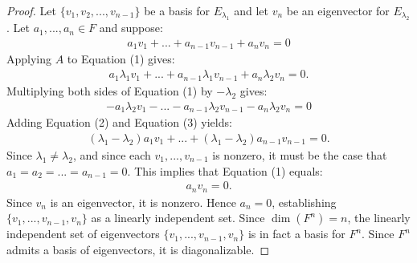\documentclass[10pt,twoside,openany]{memoir}
\begin{document}
    {\color{blue} \begin{proof}
        Let $\{v_1,v_2,...,v_{n-1}\}$ be a basis for $E_{\lambda_1}$ and let $v_n$ be an eigenvector for $E_{\lambda_2}$. Let $a_1,...,a_n \in F$ and suppose: 
            \begin{equation}
            \begin{split}
                a_1v_1 + ... + a_{n-1}v_{n-1} + a_n v_n = 0
            \end{split}
            \end{equation}
        Applying $A$ to Equation (1) gives:
            \begin{equation}
            \begin{split}
                a_1 \lambda_1 v_1 + ... + a_{n-1} \lambda_1 v_{n-1} + a_n \lambda_2 v_n = 0.
            \end{split}
            \end{equation}
        Multiplying both sides of Equation (1) by $-\lambda_2$ gives:
            \begin{equation}
            \begin{split}
                -a_1\lambda_2v_1 - ... - a_{n-1}\lambda_2v_{n-1} - a_n\lambda_2 v_n = 0
            \end{split}
            \end{equation}
        Adding Equation (2) and Equation (3) yields:
            \begin{equation*}
            \begin{split}
                (\lambda_1 - \lambda_2)a_1v_1 + ... + (\lambda_1 - \lambda_2)a_{n-1}v_{n-1} = 0.
            \end{split}
            \end{equation*}
        Since $\lambda_1 \neq \lambda_2$, and since each $v_1,...,v_{n-1}$ is nonzero, it must be the case that $a_1=a_2=...=a_{n-1} = 0$. This implies that Equation (1) equals:
            \begin{equation*}
            \begin{split}
                a_n v_n = 0.
            \end{split}
            \end{equation*}
        Since $v_n$ is an eigenvector, it is nonzero. Hence $a_n = 0$, establishing $\{v_1,...,v_{n-1},v_n\}$ as a linearly independent set. Since $\dim(F^n) = n$, the linearly independent set of eigenvectors $\{v_1,...,v_{n-1},v_n\}$ is in fact a basis for $F^n$. Since $F^n$ admits a basis of eigenvectors, it is diagonalizable.
    \end{proof}}
\end{document}

